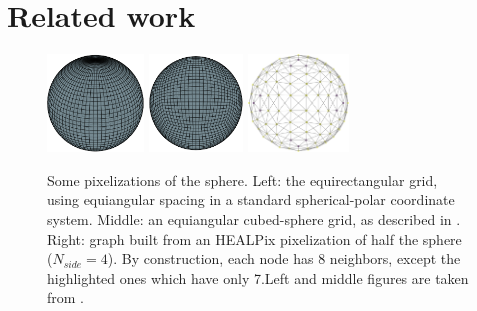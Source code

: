 \documentclass[final,twocolumn,3p,times,authoryear]{elsarticle}
\newcommand{\1}{\b{1}}              %
\newcommand{\0}{\b{0}}              %
\begin{document}
\section{Related work}
\label{sec:related}

\begin{figure}
    \centering
    \includegraphics[height=7em]{sphere_grid_equirectangular}
    \hfill
    \includegraphics[height=7em]{sphere_grid_cubedsphere}
    \hfill
    \includegraphics[height=7em]{half_graph_4}
    \caption[]{Some pixelizations of the sphere. Left: the equirectangular grid, using equiangular spacing in a standard spherical-polar coordinate system. Middle: an equiangular cubed-sphere grid, as described in \citet{ronchi1996cubed}. Right: graph built from an HEALPix pixelization of half the sphere ($N_{side} = 4$). By construction, each node has 8 neighbors, except the highlighted ones which have only 7.\footnotemark[7] Left and middle figures are taken from \citet{boomsma2017spherical}.}
    \label{fig:sphere_grids}
    \label{fig:healpix_graph_4}
\end{figure}
\end{document}
